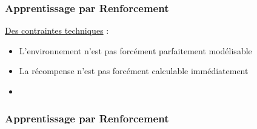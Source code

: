 \documentclass{formation}
\begin{document}
\begin{frame}
  \frametitle{Apprentissage par Renforcement}
  \underline{Des contraintes techniques} :
  \begin{itemize}
  \item L'environnement n'est pas forcément parfaitement modélisable
  \item La récompense n'est pas forcément calculable immédiatement
  \item {}
  \end{itemize}
\end{frame}

\begin{frame}
  \frametitle{Apprentissage par Renforcement}
\end{frame}
\end{document}
